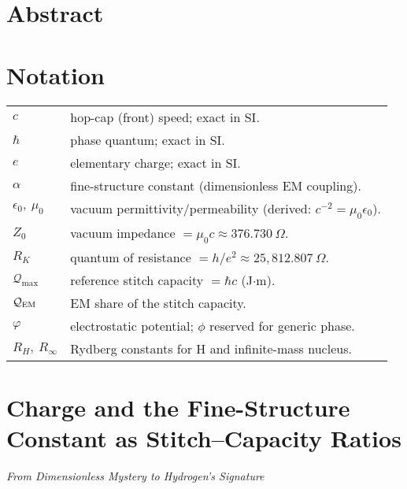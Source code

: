 \documentclass[11pt,oneside]{article}
\title{\PaperTitleMain}
\author{\Authors}
\author{\AuthorName}
\author{Author Name}
\date{\today}
\begin{document}
\maketitle


\clearpage
\section*{Abstract}


\section*{Notation}
\noindent
\begin{tabular}{@{}ll}
$c$ & hop-cap (front) speed; exact in SI.\\
$\hbar$ & phase quantum; exact in SI.\\
$e$ & elementary charge; exact in SI.\\
$\alpha$ & fine-structure constant (dimensionless EM coupling).\\
$\epsilon_0,\ \mu_0$ & vacuum permittivity/permeability (derived: $c^{-2}=\mu_0\epsilon_0$).\\
$Z_0$ & vacuum impedance $=\mu_0 c \approx 376.730~\Omega$.\\
$R_K$ & quantum of resistance $=h/e^2 \approx 25{,}812.807~\Omega$.\\
$\mathcal Q_{\max}$ & reference stitch capacity $=\hbar c$ (J$\cdot$m).\\
$\mathcal Q_{\rm EM}$ & EM share of the stitch capacity.\\
$\varphi$ & electrostatic potential; $\phi$ reserved for generic phase.\\
$R_H,\ R_\infty$ & Rydberg constants for H and infinite-mass nucleus.\\
\end{tabular}

\section{Charge and the Fine-Structure Constant as Stitch--Capacity Ratios}
\textit{From Dimensionless Mystery to Hydrogen's Signature}
\end{document}
